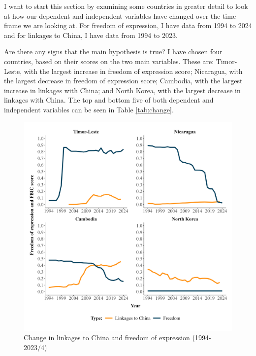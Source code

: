 I want to start this section by examining some countries in greater detail to look at how our dependent and independent variables have changed over the time frame we are looking at. For freedom of expression, I have data from 1994 to 2024 and for linkages to China, I have data from 1994 to 2023. 

Are there any signs that the main hypothesis is true? I have chosen four countries, based on their scores on the two main variables. These are: Timor-Leste, with the largest increase in freedom of expression score; Nicaragua, with the largest decrease in freedom of expression score; Cambodia, with the largest increase in linkages with China; and North Korea, with the largest decrease in linkages with China. The top and bottom five of both dependent and independent variables can be seen in Table \ref{tab:change}.

\begin{figure}[!hbt]
    \centering
    \includegraphics[width=\linewidth]{graphics/single_country_plots.jpeg}
    \caption{Change in linkages to China and freedom of expression (1994-2023/4)}
    \label{fig:scp}
\end{figure}


